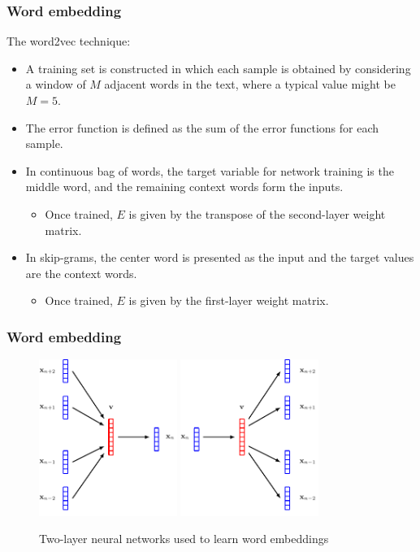\documentclass{beamer}
\begin{document}
\begin{frame}
    \frametitle{Word embedding}
    The word2vec technique:
    \begin{itemize}
        \item A training set is constructed in which each sample is obtained by considering a window of $M$ adjacent words in the text, where a typical value might be $M=5$.
        \item The error function is defined as the sum of the error functions for each sample.
        \item In continuous bag of words, the target variable for network training is the middle word, and the remaining context words form the inputs.
        \begin{itemize}
            \item Once trained, $E$ is given by the transpose of the second-layer weight matrix.
        \end{itemize}
        \item In skip-grams, the center word is presented as the input and the target values are the context words.
        \begin{itemize}
            \item Once trained, $E$ is given by the first-layer weight matrix.
        \end{itemize}
    \end{itemize}
\end{frame}

\begin{frame}
    \frametitle{Word embedding}
    \begin{figure}
        \caption{Two-layer neural networks used to learn word embeddings}
        \includegraphics[width=0.4\textwidth]{Figure_11_a.pdf}
        \includegraphics[width=0.4\textwidth]{Figure_11_b.pdf}
    \end{figure}
\end{frame}
\end{document}
